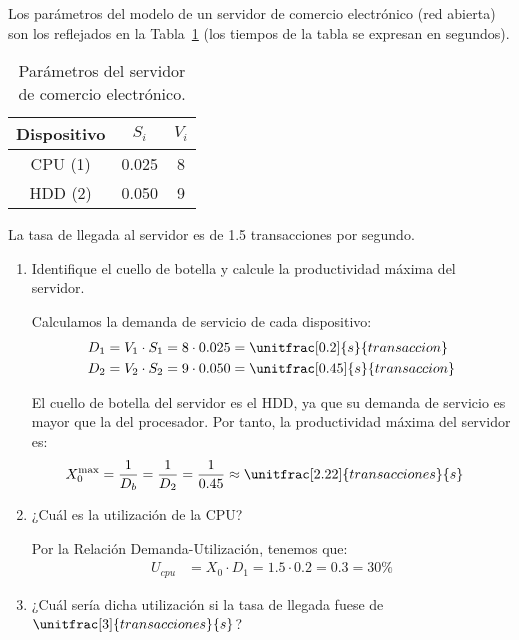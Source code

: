 \begin{ejercicio}\label{ej:5.29}
    Los parámetros del modelo de un servidor de comercio electrónico (red abierta) son los reflejados en la Tabla~\ref{tab:5.29} (los tiempos de la tabla se expresan en segundos).
    \begin{table}[h]
        \centering
        \begin{tabular}{|c|c|c|}
            \hline
            Dispositivo & $S_i$ & $V_i$ \\
            \hline
            CPU (1) & 0.025 & 8 \\
            HDD (2) & 0.050 & 9 \\
            \hline
        \end{tabular}
        \caption{Parámetros del servidor de comercio electrónico.}
        \label{tab:5.29}
    \end{table}
    La tasa de llegada al servidor es de 1.5 transacciones por segundo.
    \begin{enumerate}
        \item Identifique el cuello de botella y calcule la productividad máxima del servidor.
        
        Calculamos la demanda de servicio de cada dispositivo:
        \begin{align*}
            D_1 &= V_1 \cdot S_1 = 8 \cdot 0.025 = \unitfrac[0.2]{s}{transaccion} \\
            D_2 &= V_2 \cdot S_2 = 9 \cdot 0.050 = \unitfrac[0.45]{s}{transaccion}
        \end{align*}

        El cuello de botella del servidor es el HDD, ya que su demanda de servicio es mayor que la del procesador. Por tanto, la productividad máxima del servidor es:
        \begin{align*}
            X_0^{\max} &= \dfrac{1}{D_b} = \dfrac{1}{D_2} = \dfrac{1}{0.45} \approx \unitfrac[2.22]{transacciones}{s}
        \end{align*}
        \item ¿Cuál es la utilización de la CPU?
        
        Por la Relación Demanda-Utilización, tenemos que:
        \begin{align*}
            U_{cpu} &= X_0 \cdot D_1 = 1.5 \cdot 0.2 = 0.3 = 30\%
        \end{align*}
        \item ¿Cuál sería dicha utilización si la tasa de llegada fuese de $\unitfrac[3]{transacciones}{s}$?
        

\end{enumerate}
\end{ejercicio}

